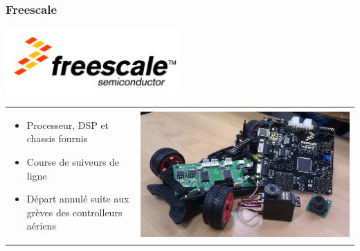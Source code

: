 \documentclass[9pt]{beamer}
\begin{document}
\begin{frame}
	\frametitle{Freescale}
	
	\begin{center}
		\includegraphics[width=0.5\textwidth]{freescale}
	\end{center}
	
	\vspace{1cm}
	
	\begin{tabular}{ l l }
		\begin{minipage}[c]{.5\linewidth}
			\begin{itemize}    
				\item Processeur, DSP et chassis fournis   
				\item Course de suiveurs de ligne   
				\item Départ annulé suite aux grèves des controlleurs aériens     
			\end{itemize}
		\end{minipage} &  
		\begin{minipage}[c]{.5\linewidth}
			\includegraphics[width=\textwidth]{freescale-kit} 
		\end{minipage}\\

	\end{tabular}
	
	

\end{frame}
\end{document}
